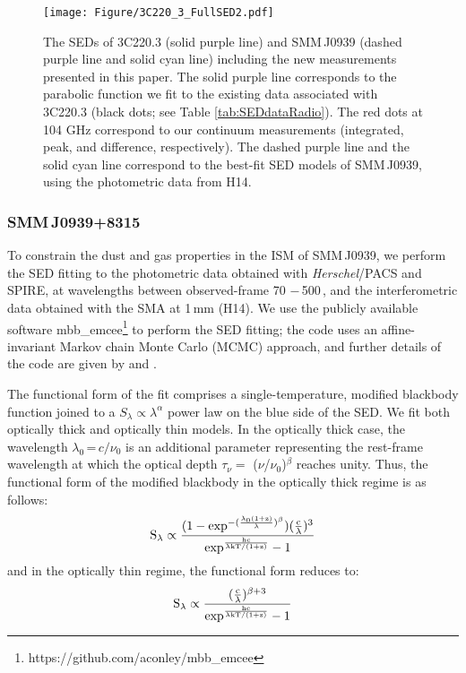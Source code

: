 \documentclass[twocolumn,apj,numberedappendix]{emulateapj}
\begin{document}
\begin{figure}[!tbph]
\centering
\texttt{[image: Figure/3C220\_3\_FullSED2.pdf]}
\caption{The SEDs of 3C220.3 (solid purple line) and SMM\,J0939 (dashed purple line and solid cyan line) including the new measurements presented in this paper. 
The solid purple line corresponds to the parabolic function we 
fit to the existing data associated with 3C220.3 (black dots; see Table \ref{tab:SEDdataRadio}).
The red dots at 104 GHz correspond to 
our continuum measurements (integrated, peak, and difference, respectively).
The dashed purple line and 
the solid cyan line correspond to the best-fit SED models of SMM\,J0939, using the photometric data from H14. \label{fig:SED}}
\end{figure}

\subsubsection{SMM\,J0939+8315} \label{sec:SEDBg}
To constrain the dust and gas properties in the ISM of SMM\,J0939, we perform the SED fitting to the
photometric data obtained with {\it Herschel}/PACS and SPIRE, at wavelengths
between observed-frame 70\,\micron\,$-$\,500\,\micron, and the interferometric data obtained with the SMA at 1\,mm (H14). We use the publicly
available software {\sc mbb\_emcee}\footnote{https://github.com/aconley/mbb\_emcee} to perform the SED fitting; the code uses an affine-invariant Markov chain Monte
Carlo (MCMC) approach, and further details of the code are given by \citet{Riechers13a} and \citet{Dowell14a}. \par
The
functional form of the fit comprises a single-temperature, modified blackbody function joined to a $S_{\lambda} \propto \lambda^\alpha
$ power law on the blue
side of the SED.
We fit both optically thick and optically thin models. In the optically thick case, the wavelength $
\lambda_0$\,=\,${c}/{\nu_0}$ is an additional parameter representing the rest-frame wavelength at which the optical
depth $\tau_{\nu} =$ ($\nu$/$\nu_0$)$^\beta$ reaches unity. Thus, the functional form of the modified blackbody
in the optically thick regime is as follows:
\begin{equation}
\rm S_{\lambda} \propto \frac{(1-exp^{-(\frac{\lambda_0 (1+z)}{\lambda})^{\beta}})(\frac{c}{\lambda})^3}
{exp^{\frac{hc}{\lambda\rm{kT/(1+z)} } }-1}
\end{equation}
and in the optically thin regime, the functional form reduces to:
\begin{equation}
\rm S_{\lambda} \propto \frac{(\frac{c}{\lambda})^{\beta+3}}{exp^{\frac{hc}{\lambda\rm{kT/(1+z)}}}-1}
\end{equation}
\end{document}
